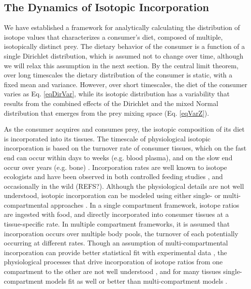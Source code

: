 \documentclass{frontiersSCNS}
\begin{document}
\subsection*{The Dynamics of Isotopic Incorporation}
We have established a framework for analytically calculating the distribution of isotope values that characterizes a consumer's diet, composed of multiple, isotopically distinct prey.
The dietary behavior of the consumer is a function of a single Dirichlet distribution, which is assumed not to change over time, although we will relax this assumption in the next section.
By the central limit theorem, over long timescales the dietary distribution of the consumer is static, with a fixed mean and variance.
However, over short timescales, the diet of the consumer varies as Eq. \ref{eqDirVar}, while its isotopic distribution has a variability that results from the combined effects of the Dirichlet and the mixed Normal distribution that emerges from the prey mixing space (Eq. \ref{eqVarZ}).

As the consumer acquires and consumes prey, the isotopic composition of its diet is incorporated into its tissues.
The timescale of physiological isotopic incorporation is based on the turnover rate of consumer tissues, which on the fast end can occur within days to weeks (e.g. blood plasma), and on the slow end occur over years (e.g. bone) \citep{Tieszen:1983ij}.
Incorporation rates are well known to isotope ecologists and have been observed in both controlled feeding studies \citep{Kurle:2009ch,Kim:2012kc}, and occasionally in the wild (REFS?).
Although the physiological details are not well understood, isotopic incorporation can be modeled using either single- or multi-compartmental approaches \citep{Cerling:2006kv,delRio:2008bs}.
In a single compartment framework, isotope ratios are ingested with food, and directly incorporated into consumer tissues at a tissue-specific rate.
In multiple compartment frameworks, it is assumed that incorporation occurs over multiple body pools, the turnover of each potentially occurring at different rates.
Though an assumption of multi-compartmental incorporation can provide better statistical fit with experimental data \citep{Cerling:2006kv,Kurle:2009ch,Carleton:2008cq}, the physiological processes that drive incorporation of isotope ratios from one compartment to the other are not well understood \citep{delRio:2008bs}, and for many tissues single-compartment models fit as well or better than multi-compartment models \citep{Kurle:2009ch}.
\end{document}
